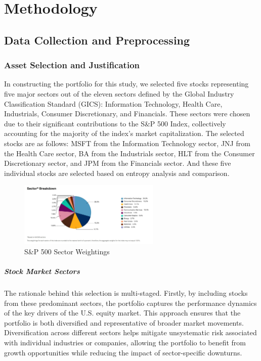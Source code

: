 
\chapter{Methodology}\label{chapter:methodology}

\section{Data Collection and Preprocessing}

\subsection{Asset Selection and Justification}


In constructing the portfolio for this study, we selected five stocks representing five major sectors out of the eleven sectors defined by the Global Industry Classification Standard (GICS): Information Technology, Health Care, Industrials, Consumer Discretionary, and Financials. These sectors were chosen due to their significant contributions to the S\&P 500 Index, collectively accounting for the majority of the index's market capitalization. The selected stocks are as follows: \ac{MSFT} from the Information Technology sector, \ac{JNJ} from the Health Care sector, \ac{BA} from the Industrials sector, \ac{HLT} from the Consumer Discretionary sector, and \ac{JPM} from the Financials sector. And these five individual stocks are selected based on entropy analysis and comparison.

\begin{figure}[htbp]
    \centering
    \includegraphics[width=0.6\textwidth]{figures/Sector-SP.png}
    \caption{S\&P 500 Sector Weightings}
    \label{fig:sector_sp}
\end{figure}

\paragraph{Stock Market Sectors}
The rationale behind this selection is multi-staged. Firstly, by including stocks from these predominant sectors, the portfolio captures the performance dynamics of the key drivers of the U.S. equity market. This approach ensures that the portfolio is both diversified and representative of broader market movements. Diversification across different sectors helps mitigate unsystematic risk associated with individual industries or companies, allowing the portfolio to benefit from growth opportunities while reducing the impact of sector-specific downturns.

